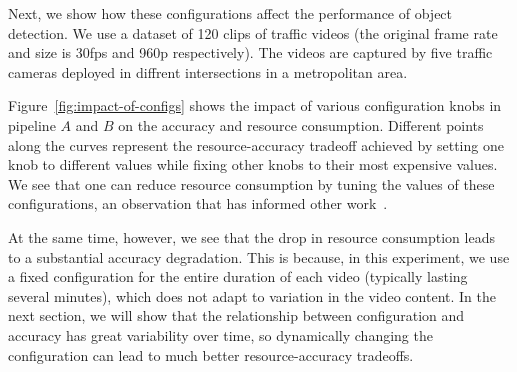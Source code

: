 


Next, we show how these configurations affect the performance of object
detection.
We use a dataset of 120 clips of traffic videos (the original frame rate and size is 30fps and 960p respectively). The videos are captured by five traffic cameras deployed in diffrent intersections in a metropolitan area.

Figure~\ref{fig:impact-of-configs} shows the impact of various 
configuration knobs in pipeline 
$A$ and $B$ on 
the accuracy and resource consumption.
Different points along the curves represent the resource-accuracy 
tradeoff achieved by setting one knob to different values while 
fixing other knobs to their most expensive values.
We see that one can reduce resource consumption by tuning the values
of these configurations, an observation that has informed 
other work~\cite{videostar}.

At the same time, however, we see that the drop in resource consumption
leads to a substantial accuracy degradation.
This is because, in this experiment, we use a fixed 
configuration for the entire duration of each video (typically lasting
several minutes), which does not adapt to variation in the video content.%
In the next section, we will show that the relationship between 
configuration and accuracy has great variability over time, so 
dynamically changing the configuration can lead to much better
resource-accuracy tradeoffs.





